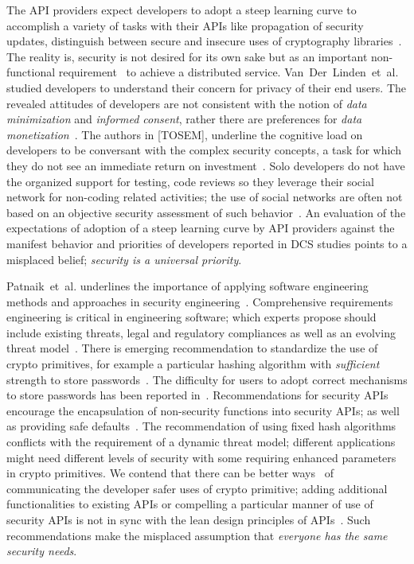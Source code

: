 \documentclass[conference]{IEEEtran}
\newcommand{\etal}[0]{et~al{.}}
\begin{document}
The API providers expect developers to adopt a steep learning curve to accomplish a variety of tasks with their APIs like propagation of security updates, distinguish between secure and insecure uses of cryptography libraries~\cite{erikacar2017,tahaei2019,acarusability2017}. The reality is, security is not desired for its own sake but as an important non-functional requirement~\cite{acar2016} to achieve a distributed service. Van~Der~Linden~\etal{} studied developers to understand their concern for privacy of their end users. The revealed attitudes of developers are not consistent with the notion of \emph{data minimization} and \emph{informed consent}, rather there are preferences for \emph{data monetization}~\cite{linden2019}. The authors in [TOSEM], underline the cognitive load on developers to be conversant with the complex security concepts, a task for which they do not see an immediate return on investment~\cite{naiakshina2019}. Solo developers do not have the organized support for testing, code reviews so they leverage their social network for non-coding related activities; the use of social networks are often not based on an objective security assessment of such behavior~\cite{irum2020,linden2020}. An evaluation of the expectations of adoption of a steep learning curve by API providers against the manifest behavior and priorities of developers reported in \ac{DCS} studies points to a misplaced belief; \emph{security is a universal priority}.

Patnaik~\etal{} underlines the importance of applying software engineering methods and approaches in security engineering~\cite{patnaik2021classics}. Comprehensive requirements engineering is critical in engineering software; which experts propose should include existing threats, legal and regulatory compliances as well as an evolving threat  model~\cite{cybok-ssl}. There is emerging recommendation to standardize the use of crypto primitives, for example a particular hashing algorithm with \emph{sufficient} strength to store passwords~\cite{wijayrathna2018password}. The difficulty for users to adopt correct mechanisms to store passwords has been reported in~\cite{joseph2021,naiakshina2017}. Recommendations for security APIs encourage the encapsulation of non-security functions into security APIs; as well as providing safe defaults~\cite{smithgreen2016}. The recommendation of using fixed hash algorithms conflicts with the requirement of a dynamic threat model; different applications might need different levels of security with some requiring enhanced parameters in crypto primitives. We contend that there can be better ways~\cite{rahaman2018tutorial} of communicating the developer safer uses of crypto primitive; adding additional functionalities to existing APIs or compelling a particular manner of use of security APIs is not in sync with the lean design principles of APIs~\cite{bloch2006}. Such recommendations make the misplaced assumption that \emph{everyone has the same security needs}. 
 
\end{document}
